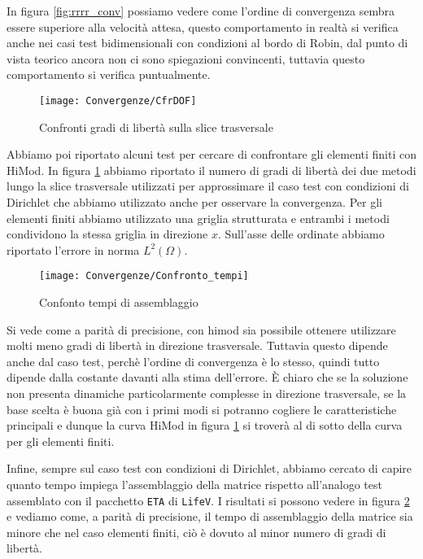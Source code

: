 In figura \ref{fig:rrrr_conv} possiamo 
vedere come l'ordine di convergenza sembra essere superiore alla velocit\`a attesa, questo comportamento in realt\`a 
si verifica anche nei casi test bidimensionali con condizioni al bordo di Robin, dal punto di vista teorico ancora non ci sono 
spiegazioni convincenti, tuttavia questo comportamento si verifica puntualmente.

\begin{figure}[!h]
\centering
\texttt{[image: Convergenze/CfrDOF]}
\caption{Confronti gradi di libert\`a sulla slice trasversale}
\label{fig:dof}
\end{figure}

Abbiamo poi riportato alcuni test per cercare di confrontare gli elementi finiti con HiMod.
In figura \ref{fig:dof} abbiamo riportato il numero di gradi di libert\`a dei due metodi lungo la slice trasversale utilizzati per 
approssimare il caso test con condizioni di Dirichlet che abbiamo utilizzato anche per osservare la convergenza.
Per gli elementi finiti abbiamo utilizzato una griglia strutturata e entrambi i metodi condividono la stessa griglia 
in direzione $x$. Sull'asse delle ordinate abbiamo riportato l'errore in norma $L^2(\Omega)$.

\begin{figure}[!htbp]
\centering
\texttt{[image: Convergenze/Confronto\_tempi]}
\caption{Confonto tempi di assemblaggio}
\label{fig:time}
\end{figure}

Si vede come a parit\`a di precisione, con himod sia possibile ottenere utilizzare molti meno gradi di libert\`a in direzione trasversale.
Tuttavia questo dipende anche dal caso test, perch\`e l'ordine di convergenza \`e lo stesso, quindi tutto dipende dalla 
costante davanti alla stima dell'errore. \`E chiaro che se la soluzione non presenta dinamiche particolarmente complesse in direzione trasversale,
se la base scelta \`e buona gi\`a con i primi modi si potranno cogliere le caratteristiche principali e dunque la curva HiMod
in figura \ref{fig:dof} si trover\`a al di sotto della curva per gli elementi finiti.

Infine, sempre sul caso test con condizioni di Dirichlet, abbiamo cercato di capire quanto tempo impiega l'assemblaggio della matrice
rispetto all'analogo test assemblato con il pacchetto \texttt{ETA} di \texttt{LifeV}.
I risultati si possono vedere in figura \ref{fig:time} e vediamo come, a parit\`a di precisione, il tempo di assemblaggio 
della matrice sia minore che nel caso elementi finiti, ci\`o \`e dovuto al minor numero di gradi di libert\`a.
